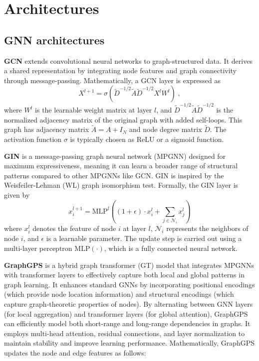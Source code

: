 \section{Architectures}

\subsection{GNN architectures}\label{appendix-gnn-architectures}

\textbf{GCN} extends convolutional neural networks to graph-structured data. It derives a shared representation by integrating node features and graph connectivity through message-passing. Mathematically, a GCN layer is expressed as  
\[
X^{l+1} = \sigma \left( \tilde{D}^{-1/2} \tilde{A} \tilde{D}^{-1/2} X^{l} W^{l} \right) \; ,
\]
where \(W^{l}\) is the learnable weight matrix at layer \(l\), and  
$\tilde{D}^{-1/2} \tilde{A} \tilde{D}^{-1/2}$ is the normalized adjacency matrix of the original graph with added self-loops. This graph has adjacency matrix $\tilde{A}=A+I_N$ and node degree matrix $\tilde{D}$. The activation function \(\sigma\) is typically chosen as ReLU or a sigmoid function. 


\textbf{GIN} is a message-passing graph neural network (MPGNN) designed for maximum expressiveness, meaning it can learn a broader range of structural patterns compared to other MPGNNs like GCN. GIN is inspired by the Weisfeiler-Lehman (WL) graph isomorphism test. Formally, the GIN layer is given by  
\begin{equation}
x_i^{l+1} = \text{MLP}^{l} \left((1+\epsilon)\cdot x_i^{l}+ 
\sum_{j \in \mathcal{N}_i} x_j^{l} \right)
\end{equation}
where \(x_i^{l}\) denotes the feature of node \(i\) at layer \(l\), \(\mathcal{N}_i\) represents the neighbors of node \(i\), and \(\epsilon\) is a learnable parameter. The update step is carried out using a multi-layer perceptron \(\text{MLP}(\cdot)\), which is a fully connected neural network.


\textbf{GraphGPS} is a hybrid graph transformer (GT) model that integrates MPGNNs with transformer layers to effectively capture both local and global patterns in graph learning. It enhances standard GNNs by incorporating positional encodings (which provide node location information) and structural encodings (which capture graph-theoretic properties of nodes). By alternating between GNN layers (for local aggregation) and transformer layers (for global attention), GraphGPS can efficiently model both short-range and long-range dependencies in graphs. It employs multi-head attention, residual connections, and layer normalization to maintain stability and improve learning performance. Mathematically, GraphGPS updates the node and edge features as follows:

